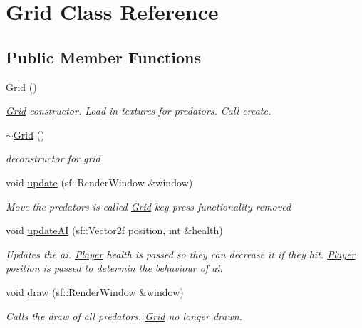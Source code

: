 \hypertarget{class_grid}{}\section{Grid Class Reference}
\label{class_grid}
\subsection*{Public Member Functions}
\begin{DoxyCompactItemize}
\item 
\mbox{\hyperlink{class_grid_a4ac9ff4f63552b4c61ff90fcb35ad66c}{Grid}} ()
\begin{DoxyCompactList}\small\item\em \mbox{\hyperlink{class_grid}{Grid}} constructor. Load in textures for predators. Call create. \end{DoxyCompactList}\item 
\mbox{\hyperlink{class_grid_a3661d0a7f998caaaf8627d7a67072116}{$\sim$\+Grid}} ()
\begin{DoxyCompactList}\small\item\em deconstructor for grid \end{DoxyCompactList}\item 
void \mbox{\hyperlink{class_grid_a3663bc64d98e521de255d42a971072cc}{update}} (sf\+::\+Render\+Window \&window)
\begin{DoxyCompactList}\small\item\em Move the predators is called \mbox{\hyperlink{class_grid}{Grid}} key press functionality removed \end{DoxyCompactList}\item 
void \mbox{\hyperlink{class_grid_aed35b0297be5c00ed36e8d27e525fdaa}{update\+AI}} (sf\+::\+Vector2f position, int \&health)
\begin{DoxyCompactList}\small\item\em Updates the ai. \mbox{\hyperlink{class_player}{Player}} health is passed so they can decrease it if they hit. \mbox{\hyperlink{class_player}{Player}} position is passed to determin the behaviour of ai. \end{DoxyCompactList}\item 
void \mbox{\hyperlink{class_grid_a9b42b1d0dcfc434d790b11faf4b461ce}{draw}} (sf\+::\+Render\+Window \&window)
\begin{DoxyCompactList}\small\item\em Calls the draw of all predators. \mbox{\hyperlink{class_grid}{Grid}} no longer drawn. \end{DoxyCompactList}\item 

\end{DoxyCompactItemize}
